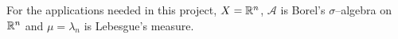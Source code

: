 For the applications needed in this project, $X = \mathbb{R}^n$, $\mathcal{A}$ is
Borel's $\sigma$--algebra on $\mathbb{R}^n$ and $\mu = \lambda_n$ is Lebesgue's
measure.




